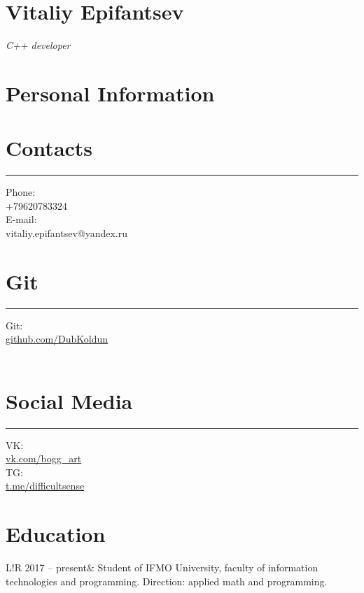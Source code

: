 \documentclass[]{report}
\author{Vitaliy Epifantsev}
\newcommand\VRule{\color{lightgray}\vrule width 0.5pt}
\begin{document}
\section*{\huge Vitaliy Epifantsev}
\textit{\large C++ developer}


\section*{\Large Personal Information}

\begin{multicols}{3}

\section*{Contacts}
\hrule\medskip
Phone:\\\smallskip +79620783324\\
E-mail:\\\smallskip vitaliy.epifantsev@yandex.ru

\columnbreak

\section*{Git}
\hrule\medskip
Git:\\\smallskip \href{http://www.github.com/DubKoldun}{github.com/DubKoldun}\\
\\\smallskip 

\columnbreak

\section*{Social Media}
\hrule\medskip
VK:\\\smallskip \href{http://www.vk.com/bogg_art}{vk.com/bogg\_art}\\
TG:\\\smallskip \href{http://www.t.me/difficultsense}{t.me/difficultsense}
\columnbreak

\end{multicols}



\section*{\Large Education}

\begin{tabular}{L!{\VRule}R}
2017 -- present& Student of IFMO University, faculty of information technologies and programming. Direction: applied math and programming.
\end{tabular}
\end{document}

